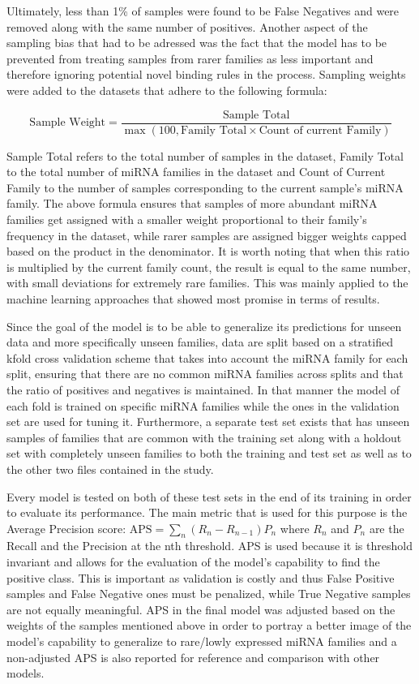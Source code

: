\documentclass[en,ack]{dimscthesis}
\begin{document}
Ultimately, less than 1\% of samples were found to be False Negatives and were removed along with the same number of positives.
Another aspect of the sampling bias that had to be adressed was the fact that the model has to be prevented from treating samples from rarer families as less important and therefore ignoring potential novel binding rules in the process. Sampling weights were added to the datasets that adhere to the following formula: 

\begin{equation}
	\text{Sample Weight} = \frac{\text{Sample Total}}{\max(100, \text{Family Total} \times \text{Count of current Family})}
\end{equation}

Sample Total refers to the total number of samples in the dataset, Family Total to the total number of miRNA families in the dataset and Count of Current Family to the number of samples corresponding to the current sample's miRNA family. The above formula ensures that samples of more abundant miRNA families get assigned with a smaller weight proportional to their family's frequency in the dataset, while rarer samples are assigned bigger weights capped based on the product in the denominator. It is worth noting that when this ratio is multiplied by the current family count, the result is equal to the same number, with small deviations for extremely rare families. This was mainly applied to the machine learning approaches that showed most promise in terms of results.
\newpage

Since the goal of the model is to be able to generalize its predictions for unseen data and more specifically unseen families, data are split based on a stratified kfold cross validation scheme that takes into account the miRNA family for each split, ensuring that there are no common miRNA families across splits and that the ratio of positives and negatives is maintained. In that manner the model of each fold is trained on specific miRNA families while the ones in the validation set are used for tuning it. Furthermore, a separate test set exists that has unseen samples of families that are common with the training set along with a holdout set with completely unseen families to both the training and test set as well as to the other two files contained in the study. 

Every model is tested on both of these test sets in the end of its training in order to evaluate its performance. The main metric that is used for this purpose is the Average Precision score: $\text{APS} = \sum_n(R_n - R_{n-1})P_n$ where $R_n$ and $P_n$  are the Recall and the Precision at the nth threshold. APS is used because it is threshold invariant and allows for the evaluation of the model's capability to find the positive class. This is important as validation is costly and thus False Positive samples and False Negative ones must be penalized, while True Negative samples are not equally meaningful. APS in the final model was adjusted based on the weights of the samples mentioned above in order to portray a better image of the model's capability to generalize to rare/lowly expressed miRNA families and a non-adjusted APS is also reported for reference and comparison with other models.
\end{document}
